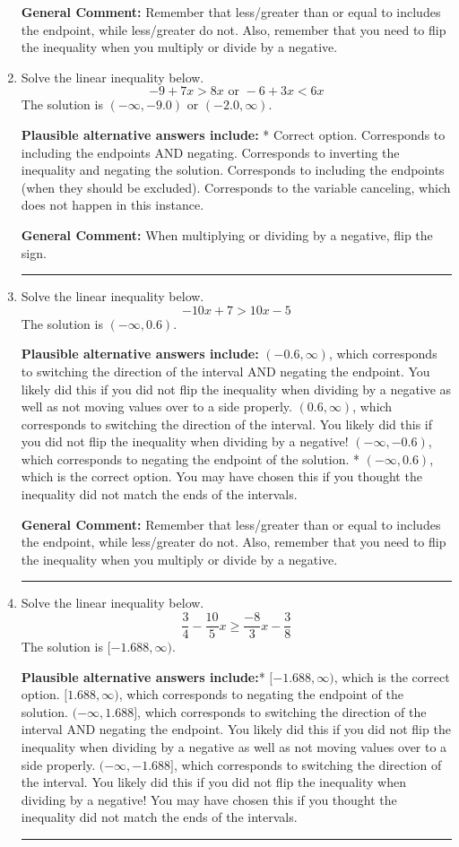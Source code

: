 \documentclass{extbook}[14pt]
\newcommand{\litem}[1]{\item #1

\rule{\textwidth}{0.4pt}}
\begin{document}
\begin{enumerate}
{\textbf{General Comment:} Remember that less/greater than or equal to includes the endpoint, while less/greater do not. Also, remember that you need to flip the inequality when you multiply or divide by a negative.
}
\litem{
Solve the linear inequality below.
\[ -9 + 7 x > 8 x \text{ or } -6 + 3 x < 6 x \]The solution is \( (-\infty, -9.0) \text{ or } (-2.0, \infty) \).\begin{enumerate}[label=\Alph*.]
\textbf{Plausible alternative answers include:} * Correct option.
Corresponds to including the endpoints AND negating.
Corresponds to inverting the inequality and negating the solution.
Corresponds to including the endpoints (when they should be excluded).
Corresponds to the variable canceling, which does not happen in this instance.
\end{enumerate}

\textbf{General Comment:} When multiplying or dividing by a negative, flip the sign.
}
\litem{
Solve the linear inequality below.
\[ -10x + 7 > 10x -5 \]The solution is \( (-\infty, 0.6) \).\begin{enumerate}[label=\Alph*.]
\textbf{Plausible alternative answers include:} $(-0.6, \infty)$, which corresponds to switching the direction of the interval AND negating the endpoint. You likely did this if you did not flip the inequality when dividing by a negative as well as not moving values over to a side properly.
 $(0.6, \infty)$, which corresponds to switching the direction of the interval. You likely did this if you did not flip the inequality when dividing by a negative!
 $(-\infty, -0.6)$, which corresponds to negating the endpoint of the solution.
* $(-\infty, 0.6)$, which is the correct option.
You may have chosen this if you thought the inequality did not match the ends of the intervals.
\end{enumerate}

\textbf{General Comment:} Remember that less/greater than or equal to includes the endpoint, while less/greater do not. Also, remember that you need to flip the inequality when you multiply or divide by a negative.
}
\litem{
Solve the linear inequality below.
\[ \frac{3}{4} - \frac{10}{5} x \geq \frac{-8}{3} x - \frac{3}{8} \]The solution is \( [-1.688, \infty) \).\begin{enumerate}[label=\Alph*.]
\textbf{Plausible alternative answers include:}* $[-1.688, \infty)$, which is the correct option.
 $[1.688, \infty)$, which corresponds to negating the endpoint of the solution.
 $(-\infty, 1.688]$, which corresponds to switching the direction of the interval AND negating the endpoint. You likely did this if you did not flip the inequality when dividing by a negative as well as not moving values over to a side properly.
 $(-\infty, -1.688]$, which corresponds to switching the direction of the interval. You likely did this if you did not flip the inequality when dividing by a negative!
You may have chosen this if you thought the inequality did not match the ends of the intervals.
\end{enumerate}

}
\end{enumerate}
\end{document}
